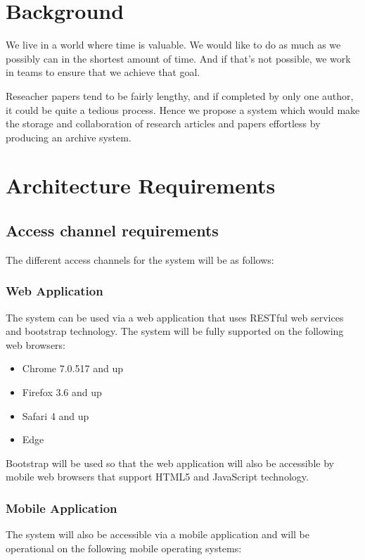 \documentclass[11pt]{article}
\begin{document}
\section{Background}

We live in a world where time is valuable. We would like to do as much as we possibly can in the shortest amount of time. And if that's not possible, we work in teams to ensure that we achieve that goal. 

Reseacher papers tend to be fairly lengthy, and if completed by only one author, it could be quite a tedious process. Hence we propose a system which would make the storage and collaboration of research articles and papers effortless by producing an archive system.

\newpage

\section{Architecture Requirements}

\subsection{Access channel requirements}
The different access channels for the system will be as follows:

\subsubsection{Web Application}
The system can be used via a web application that uses RESTful web services and bootstrap technology. The system will be fully supported on the following web browsers:

\begin{itemize}
	\item Chrome 7.0.517 and up
	\item Firefox 3.6 and up
	\item Safari 4 and up
	\item Edge
\end{itemize}

Bootstrap will be used so that the web application will also be accessible by mobile web browsers that support HTML5 and JavaScript technology.

\subsubsection{Mobile Application}
The system will also be accessible via a mobile application and will be operational on the following mobile operating systems:
\end{document}
